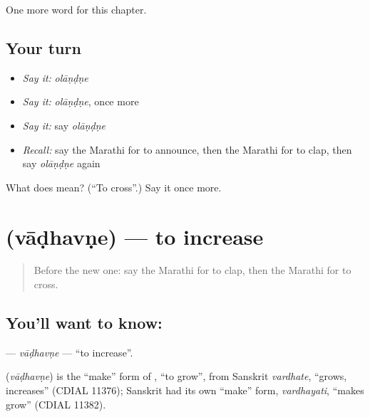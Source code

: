 \begin{grammarlens}[title={What you've built}]
One more word for this chapter.
\end{grammarlens}

\subsection*{Your turn}
\begin{itemize}
\raggedright
  \item \emph{Say it:} \emph{olāṇḍṇe}
  \item \emph{Say it:} \emph{olāṇḍṇe}, once more
  \item \emph{Say it:} say \emph{olāṇḍṇe}
  \item \emph{Recall:} say the Marathi for to announce, then the Marathi for to clap, then say \emph{olāṇḍṇe} again
\end{itemize}

\begin{tcolorbox}[breakable,colback=teal!4,colframe=teal!35!black,title={Before you move on}]
What does  mean? (\textquotedblleft{}To cross\textquotedblright{}.) Say it once more.
\end{tcolorbox}
\section[\texorpdfstring{\mr{वाढवणे} (vāḍhavṇe)}{वाढवणे (vāḍhavṇe)}]{ (vāḍhavṇe) — to increase}

\label{lesson:MR-C164-vadhavne}



\begin{quote}
Before the new one: say the Marathi for to clap, then the Marathi for to cross.
\end{quote}

\subsection*{You'll want to know: }
\textbf{} — \emph{vāḍhavṇe} — \textquotedblleft{}to increase\textquotedblright{}.

\begin{cousinweb}
\textbf{} (\emph{vāḍhavṇe}) is the \textquotedblleft{}make\textquotedblright{} form of \textbf{}, \textquotedblleft{}to grow\textquotedblright{}, from Sanskrit \emph{vardhate}, \textquotedblleft{}grows, increases\textquotedblright{} (CDIAL 11376); Sanskrit had its own \textquotedblleft{}make\textquotedblright{} form, \emph{vardhayati}, \textquotedblleft{}makes grow\textquotedblright{} (CDIAL 11382).
\end{cousinweb}


